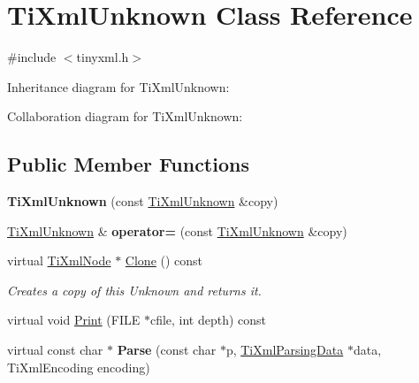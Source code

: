 \hypertarget{class_ti_xml_unknown}{
\section{\-Ti\-Xml\-Unknown \-Class \-Reference}
\label{class_ti_xml_unknown}
}


{\ttfamily \#include $<$tinyxml.\-h$>$}



\-Inheritance diagram for \-Ti\-Xml\-Unknown\-:


\-Collaboration diagram for \-Ti\-Xml\-Unknown\-:
\subsection*{\-Public \-Member \-Functions}
\begin{DoxyCompactItemize}
\item 
\hypertarget{class_ti_xml_unknown_abe798ff4feea31474850c7f0de6bdf5e}{
{\bfseries \-Ti\-Xml\-Unknown} (const \hyperlink{class_ti_xml_unknown}{\-Ti\-Xml\-Unknown} \&copy)}
\label{class_ti_xml_unknown_abe798ff4feea31474850c7f0de6bdf5e}

\item 
\hypertarget{class_ti_xml_unknown_a60560b5aacb4bdc8b2b5f02f0a99c5c0}{
\hyperlink{class_ti_xml_unknown}{\-Ti\-Xml\-Unknown} \& {\bfseries operator=} (const \hyperlink{class_ti_xml_unknown}{\-Ti\-Xml\-Unknown} \&copy)}
\label{class_ti_xml_unknown_a60560b5aacb4bdc8b2b5f02f0a99c5c0}

\item 
\hypertarget{class_ti_xml_unknown_a675c4b2684af35e4c7649b7fd5ae598d}{
virtual \hyperlink{class_ti_xml_node}{\-Ti\-Xml\-Node} $\ast$ \hyperlink{class_ti_xml_unknown_a675c4b2684af35e4c7649b7fd5ae598d}{\-Clone} () const }
\label{class_ti_xml_unknown_a675c4b2684af35e4c7649b7fd5ae598d}

\begin{DoxyCompactList}\small\item\em \-Creates a copy of this \-Unknown and returns it. \end{DoxyCompactList}\item 
virtual void \hyperlink{class_ti_xml_unknown_a025f19c21ef01ea9be50febb8fe0ba06}{\-Print} (\-F\-I\-L\-E $\ast$cfile, int depth) const 
\item 
\hypertarget{class_ti_xml_unknown_aa51c2694e4177b5f0b5429ee5a81b58d}{
virtual const char $\ast$ {\bfseries \-Parse} (const char $\ast$p, \hyperlink{class_ti_xml_parsing_data}{\-Ti\-Xml\-Parsing\-Data} $\ast$data, \-Ti\-Xml\-Encoding encoding)}
\label{class_ti_xml_unknown_aa51c2694e4177b5f0b5429ee5a81b58d}


\end{DoxyCompactItemize}
